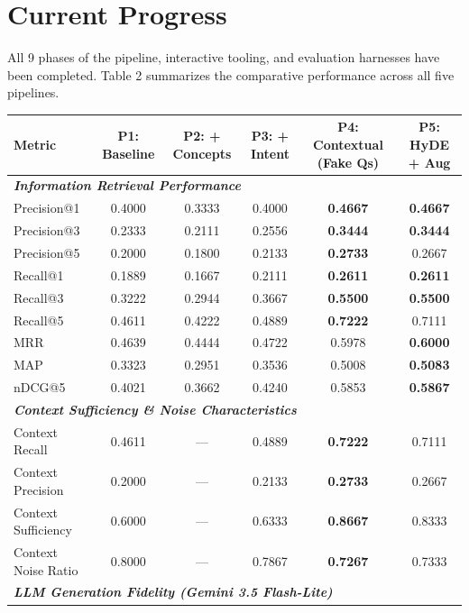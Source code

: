 \documentclass[11pt,a4paper]{article}
\begin{document}
\section{Current Progress}
All 9 phases of the pipeline, interactive tooling, and evaluation harnesses have been completed. Table 2 summarizes the comparative performance across all five pipelines.

\begin{table}[h!]
\centering
\small
\renewcommand{\arraystretch}{1.2}
\begin{tabularx}{\textwidth}{l c c c c c}
\toprule
\textbf{Metric} & \textbf{P1: Baseline} & \textbf{P2: + Concepts} & \textbf{P3: + Intent} & \textbf{P4: Contextual (Fake Qs)} & \textbf{P5: HyDE + Aug} \\
\midrule
\multicolumn{6}{l}{\textbf{\textit{Information Retrieval Performance}}} \\
Precision@1 & 0.4000 & 0.3333 & 0.4000 & \textbf{0.4667} & \textbf{0.4667} \\
Precision@3 & 0.2333 & 0.2111 & 0.2556 & \textbf{0.3444} & \textbf{0.3444} \\
Precision@5 & 0.2000 & 0.1800 & 0.2133 & \textbf{0.2733} & 0.2667 \\
Recall@1    & 0.1889 & 0.1667 & 0.2111 & \textbf{0.2611} & \textbf{0.2611} \\
Recall@3    & 0.3222 & 0.2944 & 0.3667 & \textbf{0.5500} & \textbf{0.5500} \\
Recall@5    & 0.4611 & 0.4222 & 0.4889 & \textbf{0.7222} & 0.7111 \\
MRR         & 0.4639 & 0.4444 & 0.4722 & 0.5978 & \textbf{0.6000} \\
MAP         & 0.3323 & 0.2951 & 0.3536 & 0.5008 & \textbf{0.5083} \\
nDCG@5      & 0.4021 & 0.3662 & 0.4240 & 0.5853 & \textbf{0.5867} \\
\midrule
\multicolumn{6}{l}{\textbf{\textit{Context Sufficiency \& Noise Characteristics}}} \\
Context Recall      & 0.4611 & --- & 0.4889 & \textbf{0.7222} & 0.7111 \\
Context Precision   & 0.2000 & --- & 0.2133 & \textbf{0.2733} & 0.2667 \\
Context Sufficiency & 0.6000 & --- & 0.6333 & \textbf{0.8667} & 0.8333 \\
Context Noise Ratio & 0.8000 & --- & 0.7867 & \textbf{0.7267} & 0.7333 \\
\midrule
\multicolumn{6}{l}{\textbf{\textit{LLM Generation Fidelity (Gemini 3.5 Flash-Lite)}}} \\

\end{tabularx}
\end{table}
\end{document}
